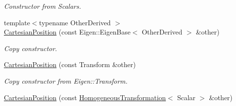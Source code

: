 \begin{DoxyCompactItemize}
\begin{DoxyCompactList}\small\item\em Constructor from Scalars. \end{DoxyCompactList}\item 
{\footnotesize template$<$typename Other\+Derived $>$ }\\\hyperlink{classow__core_1_1CartesianPosition_a27da81e6cdf3ffd4f58ee6cdbdb0b7fa}{Cartesian\+Position} (const Eigen\+::\+Eigen\+Base$<$ Other\+Derived $>$ \&other)
\begin{DoxyCompactList}\small\item\em Copy constructor. \end{DoxyCompactList}\item 
\hyperlink{classow__core_1_1CartesianPosition_a87716f0f5fd8a5ddfc1a18fb9205c4fe}{Cartesian\+Position} (const Transform \&other)\hypertarget{classow__core_1_1CartesianPosition_a87716f0f5fd8a5ddfc1a18fb9205c4fe}{}\label{classow__core_1_1CartesianPosition_a87716f0f5fd8a5ddfc1a18fb9205c4fe}

\begin{DoxyCompactList}\small\item\em Copy constructor from Eigen\+::\+Transform. \end{DoxyCompactList}\item 
\hyperlink{classow__core_1_1CartesianPosition_a7f413050004fc08ed77405dfa36e80e5}{Cartesian\+Position} (const \hyperlink{classow__core_1_1HomogeneousTransformation}{Homogeneous\+Transformation}$<$ Scalar $>$ \&other)\hypertarget{classow__core_1_1CartesianPosition_a7f413050004fc08ed77405dfa36e80e5}{}\label{classow__core_1_1CartesianPosition_a7f413050004fc08ed77405dfa36e80e5}


\end{DoxyCompactItemize}
